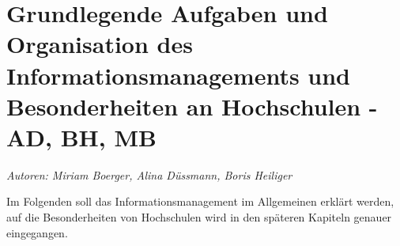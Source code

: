 \chapter{Grundlegende Aufgaben und Organisation des Informationsmanagements und Besonderheiten an Hochschulen - AD, BH, MB}
\label{chapter_grundlagen_INM}

\textit{Autoren: Miriam Boerger, Alina Düssmann, Boris Heiliger}

Im Folgenden soll das Informationsmanagement im Allgemeinen erklärt werden, auf die Besonderheiten von Hochschulen wird in den späteren Kapiteln genauer eingegangen.





